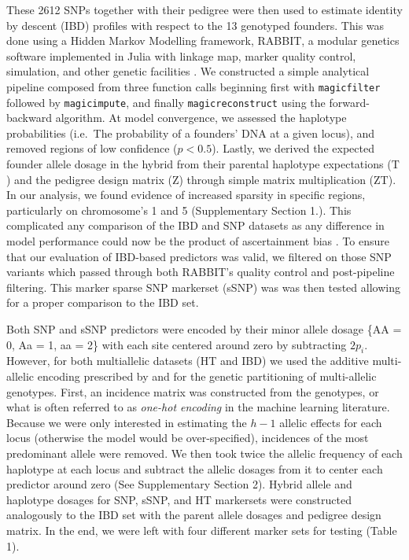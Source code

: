 These 2612 SNPs together with their pedigree were then used to estimate
identity by descent (IBD) profiles with respect to the 13 genotyped
founders. This was done using a Hidden Markov Modelling framework,
RABBIT, a modular genetics software implemented in Julia with linkage
map, marker quality control, simulation, and other genetic facilities
\autocite{Zheng2015}. We constructed a simple analytical pipeline
composed from three function calls beginning first with
\texttt{magicfilter} followed by \texttt{magicimpute}, and finally
\texttt{magicreconstruct} using the forward-backward algorithm. At model
convergence, we assessed the haplotype probabilities (i.e.~The
probability of a founders' DNA at a given locus), and removed regions of
low confidence (\(p < 0.5\)). Lastly, we derived the expected founder
allele dosage in the hybrid from their parental haplotype expectations
(\(\mathrm T\)) and the pedigree design matrix (\(\mathrm Z\)) through
simple matrix multiplication (\(\mathrm{ZT}\)). In our analysis, we
found evidence of increased sparsity in specific regions,
particularly on chromosome's 1 and 5 (Supplementary Section 1.). This complicated any
comparison of the IBD and SNP datasets as any difference in model
performance could now be the product of ascertainment bias
\autocite{Heslot2013}. To ensure that our evaluation of IBD-based
predictors was valid, we filtered on those SNP variants which passed
through both RABBIT's quality control and post-pipeline filtering.
This marker sparse SNP markerset (sSNP) was was then tested allowing for a proper comparison to the IBD set.

Both SNP and sSNP predictors were encoded by their minor allele dosage
\{AA = 0, Aa = 1, aa = 2\} with each site centered around zero by
subtracting \(2p_i\). However, for both multiallelic datasets (HT and
IBD) we used the additive multi-allelic encoding prescribed by
\autocite{Da2015} and \autocite{Schaid2004} for the genetic partitioning
of multi-allelic genotypes. First, an incidence matrix was constructed from the
genotypes, or what is often referred to as \emph{one-hot encoding} in
the machine learning literature. Because we were only interested in
estimating the \(h - 1\) allelic effects for each locus (otherwise the
model would be over-specified), incidences of the most predominant
allele were removed. We then took twice the allelic frequency of each
haplotype at each locus and subtract the allelic dosages from it to
center each predictor around zero (See Supplementary Section 2). Hybrid allele and haplotype dosages
for SNP, sSNP, and HT markersets were constructed analogously to the IBD
set with the parent allele dosages and pedigree design matrix. In the
end, we were left with four different marker sets for testing (Table 1).

